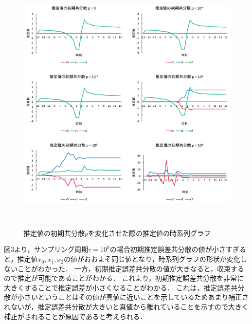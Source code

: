 \documentclass[a4paper]{jarticle}
\begin{document}
\vspace{0mm}
\begin{figure}[!h]
  \centering
  \includegraphics[width=14cm]{kalman3.png}
  \caption{推定値の初期共分散$p$を変化させた際の推定値の時系列グラフ}
　\label{graph}
\end{figure}


図3より，サンプリング周期$\tau = 10^0$の場合初期推定誤差共分散の値が小さすぎると，推定値$x_0,x_1,x_2$の値がおおよそ同じ値となり，時系列グラフの形状が変化しないことがわかった．
一方，初期推定誤差共分散の値が大きなると，収束するので推定が可能であることがわかる．
これより，初期推定誤差共分散を非常に大きくすることで推定誤差が小さくなることがわかる．
これは，推定誤差共分散が小さいということはその値が真値に近いことを示しているためあまり補正されないが，推定誤差共分散が大きいと真値から離れていることを示すので大きく補正がされることが原因であると考えられる．
\end{document}

